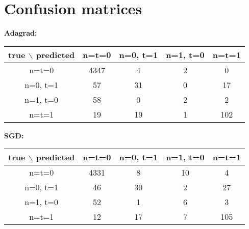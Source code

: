 \documentclass[10pt]{article}
\newcommand{\1}{\mathbbm{1}}
\newcommand{\0}{\mathbf{0}}
\begin{document}
\section{Confusion matrices}
\textbf{Adagrad: }\\
\begin{table}[H]
\centering
\begin{tabular}{|c|c|c|c|c|}
\hline
true $\backslash$ predicted & n=t=0 & n=0, t=1 & n=1, t=0 & n=t=1\\
\hline
n=t=0    & 4347     &    4     &      2      &     0\\
n=0, t=1 & 57       &   31     &      0      &    17\\
n=1, t=0 & 58       &   0      &      2      &    2\\
n=t=1    & 19       &   19     &      1      &   102\\
\hline
\end{tabular}
\end{table}


\textbf{SGD: }\\
\begin{table}[H]
\centering
\begin{tabular}{|c|c|c|c|c|}
\hline
true $\backslash$ predicted & n=t=0 & n=0, t=1 & n=1, t=0 & n=t=1\\
\hline
n=t=0     & 4331 &  8  & 10 &  4\\
n=0, t=1  &  46  &  30 &  2 &  27\\
n=1, t=0  &   52 &  1  &  6 &  3\\
n=t=1     &   12 &  17 &  7 & 105\\
\hline
\end{tabular}
\end{table}
\end{document}
